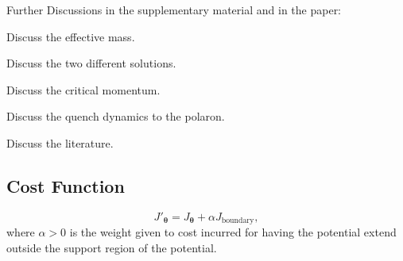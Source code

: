 \documentclass[twocolumn,amsmath,amssymb,showpacs,prl,superscriptaddress,aps]{revtex4-1}
\begin{document}
Further Discussions in the supplementary material and in the paper: 

Discuss the effective mass.

Discuss the two different solutions. 

Discuss the critical momentum. 

Discuss the quench dynamics to the polaron. 

Discuss the literature.

\subsection{Cost Function}\label{sec:cost_function}

\begin{equation}
  J'_{\mathbf{\theta}} = J_{\mathbf{\theta}} + \alpha J_{\mathrm{boundary}},
\end{equation}
where $\alpha>0$ is the weight given to cost incurred for having the potential extend outside the support region of the potential.






 
\end{document}
